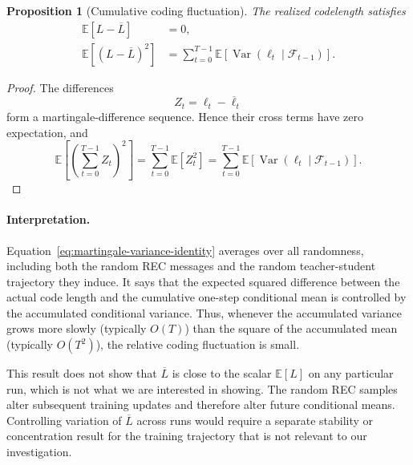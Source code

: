 \documentclass{article}
\theoremstyle{plain}
\newtheorem{proposition}[theorem]{Proposition}
\theoremstyle{definition}
\theoremstyle{remark}
\begin{document}
\begin{proposition}[Cumulative coding fluctuation]
\label{prop:cumulative-coding-fluctuation}
The realized codelength satisfies
\begin{align}
    \mathbb E[L-\overline L]
    &=
    0,
    \\
    \mathbb E\left[
      (L-\overline L)^2
    \right]
    &=
    \sum_{t=0}^{T-1}
    \mathbb E\left[
      \operatorname{Var}(\ell_t\mid\mathcal F_{t-1})
    \right].
    \label{eq:martingale-variance-identity}
\end{align}
\end{proposition}

\begin{proof}
The differences
\begin{equation}
    Z_t
    =
    \ell_t-\overline\ell_t
\end{equation}
form a martingale-difference sequence. Hence their cross terms have zero expectation, and
\begin{equation}
    \mathbb E\left[
      \left(\sum_{t=0}^{T-1}Z_t\right)^2
    \right]
    =
    \sum_{t=0}^{T-1}\mathbb E[Z_t^2]
    =
    \sum_{t=0}^{T-1}
    \mathbb E\left[
      \operatorname{Var}(\ell_t\mid\mathcal F_{t-1})
    \right].
\end{equation}
\end{proof}

\paragraph{Interpretation.}
Equation~\eqref{eq:martingale-variance-identity} averages over all randomness, including both the random REC messages and the random teacher-student trajectory they induce. It says that the expected squared difference between the actual code length and the cumulative one-step conditional mean is controlled by the accumulated conditional variance. Thus, whenever the accumulated variance grows more slowly (typically $O(T)$) than the square of the accumulated mean (typically $O(T^2)$), the relative coding fluctuation is small.

This result does not show that $\overline L$ is close to the scalar $\mathbb E[L]$ on any particular run, which is not what we are interested in showing. The random REC samples alter subsequent training updates and therefore alter future conditional means. Controlling variation of $\overline L$ across runs would require a separate stability or concentration result for the training trajectory that is not relevant to our investigation.
%
\end{document}
